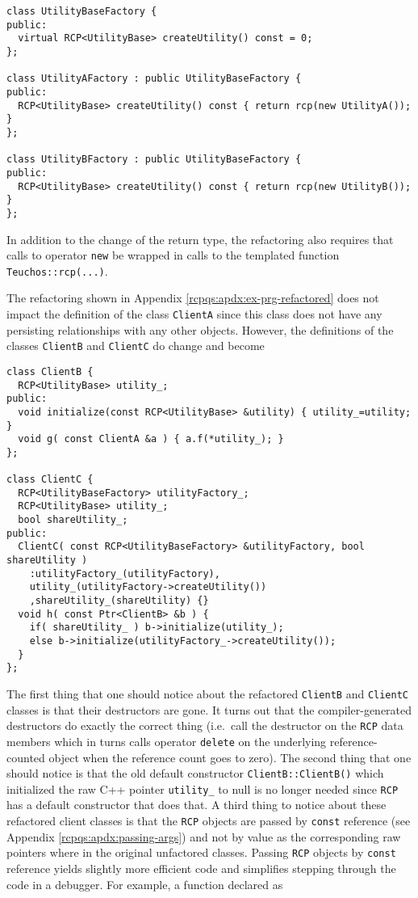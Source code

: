 \documentclass[pdf,ps2pdf,11pt]{SANDreport}
\begin{document}
{\small\begin{verbatim}
class UtilityBaseFactory {
public:
  virtual RCP<UtilityBase> createUtility() const = 0;
};

class UtilityAFactory : public UtilityBaseFactory {
public:
  RCP<UtilityBase> createUtility() const { return rcp(new UtilityA()); }
};

class UtilityBFactory : public UtilityBaseFactory {
public:
  RCP<UtilityBase> createUtility() const { return rcp(new UtilityB()); }
};
\end{verbatim}}

In addition to the change of the return type, the refactoring also
requires that calls to operator {}\texttt{new} be wrapped in calls to
the templated function {}\texttt{Teuchos\-::rcp(...)}.

The refactoring shown in Appendix {}\ref{rcpqs:apdx:ex-prg-refactored}
does not impact the definition of the class {}\texttt{ClientA} since
this class does not have any persisting relationships with any
other objects.  However, the definitions of the classes
{}\texttt{ClientB} and {}\texttt{ClientC} do change and become

{\small\begin{verbatim}
class ClientB {
  RCP<UtilityBase> utility_;
public:
  void initialize(const RCP<UtilityBase> &utility) { utility_=utility; }
  void g( const ClientA &a ) { a.f(*utility_); }
};

class ClientC {
  RCP<UtilityBaseFactory> utilityFactory_;
  RCP<UtilityBase> utility_;
  bool shareUtility_;
public:
  ClientC( const RCP<UtilityBaseFactory> &utilityFactory, bool shareUtility )
    :utilityFactory_(utilityFactory),
    utility_(utilityFactory->createUtility())
    ,shareUtility_(shareUtility) {}
  void h( const Ptr<ClientB> &b ) {
    if( shareUtility_ ) b->initialize(utility_);
    else b->initialize(utilityFactory_->createUtility());
  }
};
\end{verbatim}}

The first thing that one should notice about the refactored
{}\texttt{ClientB} and {}\texttt{ClientC} classes is that their
destructors are gone.  It turns out that the compiler-generated
destructors do exactly the correct thing (i.e.~call the destructor on
the {}\texttt{RCP} data members which in turns calls
operator {}\texttt{delete} on the underlying reference-counted object
when the reference count goes to zero).  The second thing that one
should notice is that the old default constructor
{}\texttt{ClientB::ClientB()} which initialized the raw C++ pointer
{}\texttt{utility\_} to null is no longer needed since
{}\texttt{RCP} has a default constructor that does that.
A third thing to notice about these refactored client classes is that
the {}\texttt{RCP} objects are passed by
{}\texttt{const} reference (see Appendix
{}\ref{rcpqs:apdx:passing-args}) and not by value as the corresponding
raw pointers where in the original unfactored classes.  Passing
{}\texttt{RCP} objects by {}\texttt{const} reference
yields slightly more efficient code and simplifies stepping through
the code in a debugger.  For example, a function declared as
\end{document}
